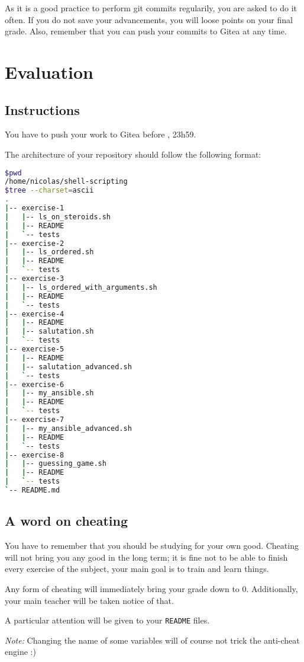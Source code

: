 \documentclass[12pt]{article}
\begin{document}
As it is a good practice to perform git commits regularily, you are asked to do it often. If you do not save your advancements, you will loose points on your final grade. Also, remember that you can push your commits to Gitea at any time.

\section{Evaluation}
\subsection{Instructions}

You have to push your work to Gitea before , 23h59.

The architecture of your repository should follow the following format:

\begin{lstlisting}[language=bash]
$pwd
/home/nicolas/shell-scripting
$tree --charset=ascii
.
|-- exercise-1
|   |-- ls_on_steroids.sh
|   |-- README
|   `-- tests
|-- exercise-2
|   |-- ls_ordered.sh
|   |-- README
|   `-- tests
|-- exercise-3
|   |-- ls_ordered_with_arguments.sh
|   |-- README
|   `-- tests
|-- exercise-4
|   |-- README
|   |-- salutation.sh
|   `-- tests
|-- exercise-5
|   |-- README
|   |-- salutation_advanced.sh
|   `-- tests
|-- exercise-6
|   |-- my_ansible.sh
|   |-- README
|   `-- tests
|-- exercise-7
|   |-- my_ansible_advanced.sh
|   |-- README
|   `-- tests
|-- exercise-8
|   |-- guessing_game.sh
|   |-- README
|   `-- tests
`-- README.md
\end{lstlisting}

\subsection{A word on cheating}

You have to remember that you should be studying for your own good. Cheating will not bring you any good in the long term; it is fine not to be able to finish every exercise of the subject, your main goal is to train and learn things.

Any form of cheating will immediately bring your grade down to 0. Additionally, your main teacher will be taken notice of that.

A particular attention will be given to your \texttt{README} files.

\textit{Note:} Changing the name of some variables will of course not trick the anti-cheat engine :)
\end{document}
